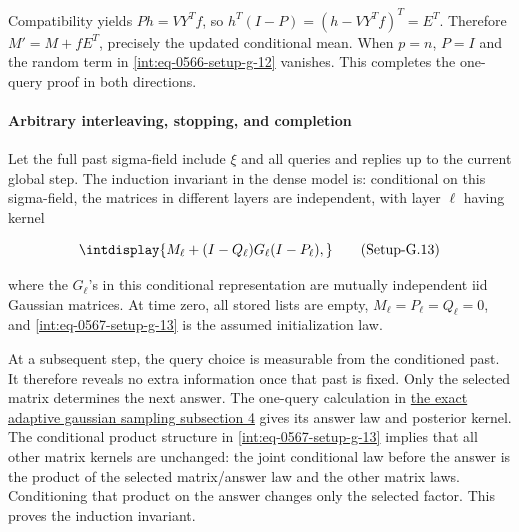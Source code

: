 
Compatibility yields \(Ph=VY^Tf\), so \(h^T(I-P)=(h-VY^Tf)^T=E^T\). Therefore \(M'=M+fE^T\), precisely the updated conditional mean. When \(p=n\), \(P=I\) and the random term in \hyperref[int:eq-setup-g-12]{\eqref{int:eq-0566-setup-g-12}} vanishes. This completes the one-query proof in both directions.


\paragraph{Arbitrary interleaving, stopping, and completion}
\label{int:setup-sampler-5}
\mbox{}\par\smallskip


Let the full past sigma-field include \(\xi\) and all queries and replies up to the current global step. The induction invariant in the dense model is: conditional on this sigma-field, the matrices in different layers are independent, with layer \(\ell\) having kernel


\label{int:eq-setup-g-13}
\begingroup\renewcommand{\theHequation}{intdisplay.1074}
\begin{equation}
\intdisplay{
M_\ell+(I-Q_\ell)G_\ell(I-P_\ell),
}
\tag{Setup-G.13}
\label{int:eq-0567-setup-g-13}
\end{equation}
\endgroup


where the \(G_\ell\)'s in this conditional representation are mutually independent iid Gaussian matrices. At time zero, all stored lists are empty, \(M_\ell=P_\ell=Q_\ell=0\), and \hyperref[int:eq-setup-g-13]{\eqref{int:eq-0567-setup-g-13}} is the assumed initialization law.



At a subsequent step, the query choice is measurable from the conditioned past. It therefore reveals no extra information once that past is fixed. Only the selected matrix determines the next answer. The one-query calculation in \hyperref[int:setup-sampler-4]{the exact adaptive gaussian sampling subsection 4} gives its answer law and posterior kernel. The conditional product structure in \hyperref[int:eq-setup-g-13]{\eqref{int:eq-0567-setup-g-13}} implies that all other matrix kernels are unchanged: the joint conditional law before the answer is the product of the selected matrix/answer law and the other matrix laws. Conditioning that product on the answer changes only the selected factor. This proves the induction invariant.


